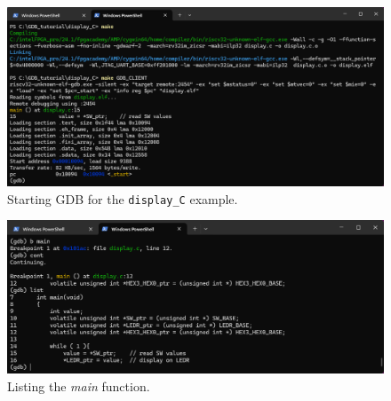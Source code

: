 \documentclass[11pt, twoside, pdftex]{article}
\begin{document}
\begin{figure}[h]
    \begin{center}
        \includegraphics[scale=.6]{figures/display_C0.png}
        \caption{Starting GDB for the \texttt{display\_C} example.}
        \label{fig:display_C0}
    \end{center}
\end{figure}

\begin{figure}[h]
    \begin{center}
        \includegraphics[scale=.6]{figures/display_C1.png}
        \caption{Listing the {\it main} function.}
        \label{fig:display_C1}
    \end{center}
\end{figure}
\end{document}
